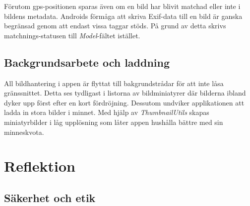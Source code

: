 \documentclass[11px, a4paper]{article}
\begin{document}
	Förutom gps-positionen sparas även om en bild har blivit matchad eller inte i bildens metadata. Androids förmåga att skriva Exif-data till en bild är ganska begränsad genom att endast vissa taggar stöds. På grund av detta skrivs matchnings-statusen till \emph{Model}-fältet istället.

\subsection{Backgrundsarbete och laddning}
	All bildhantering i appen är flyttat till bakgrundstrådar för att inte låsa gränssnittet\cite{BitmapProcessing}. Detta ses tydligast i listorna av bildminiatyrer där bilderna ibland dyker upp först efter en kort fördröjning. Dessutom undviker applikationen att ladda in stora bilder i minnet. Med hjälp av \emph{ThumbnailUtils} skapas miniatyrbilder i låg upplösning som låter appen hushålla bättre med sin minneskvota.


\section{Reflektion}

\subsection{Säkerhet och etik}



\begingroup
\raggedright


\endgroup
\end{document}
